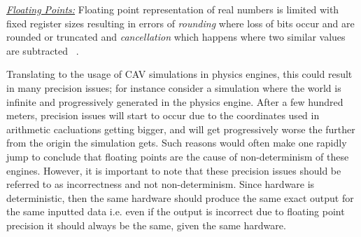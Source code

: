 \noindent\underline{\textit{Floating Points:}}
Floating point representation of real numbers is limited with fixed register sizes resulting in errors of \textit{rounding} where loss of bits occur and are rounded or truncated and \textit{cancellation} which happens where two similar values are subtracted
~\cite{FloatingPointsBook}\cite{goldberg1991every}.

Translating to the usage of CAV simulations in physics engines, this could result in many precision issues; for instance consider a simulation where the world is infinite and progressively  generated in the physics engine. 
After a few hundred meters, precision issues will start to occur due to the coordinates used in arithmetic cacluations getting bigger, and will get progressively worse the further from the origin the simulation gets. 
Such reasons would often make one rapidly jump to conclude that floating points are the cause of non-determinism of these engines. 
However, it is important to note that these precision issues should be referred to as incorrectness and not non-determinism. 
Since hardware is deterministic, then the same hardware should produce the same exact output for the same inputted data i.e. even if the output is incorrect due to floating point precision it should always be the same, given the same hardware.\\\\ 
%
%
